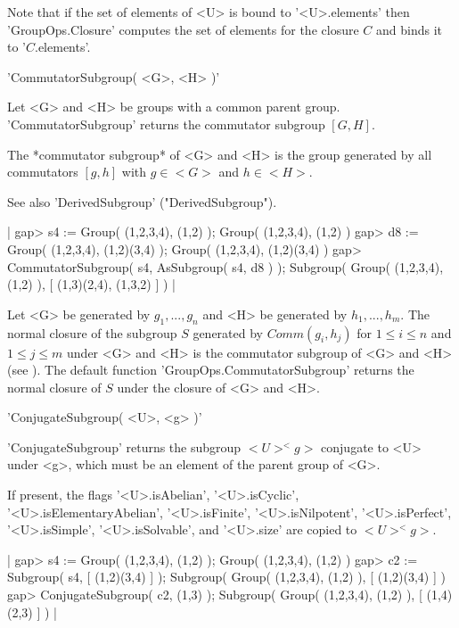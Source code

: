 Note that if the set  of elements of <U> is  bound to '<U>.elements' then
'GroupOps.Closure' computes the set of  elements for the closure $C$  and
binds it to '$C$.elements'.


'CommutatorSubgroup( <G>, <H> )'

Let <G>   and    <H>   be   groups    with   a  common     parent  group.
'CommutatorSubgroup' returns the commutator subgroup $[ G, H ]$.

The *commutator subgroup* of  <G> and <H>  is the group  generated by all
commutators $[ g, h ]$ with $g\in <G>$ and $h\in <H>$.

See also 'DerivedSubgroup' ("DerivedSubgroup").

|    gap> s4 := Group( (1,2,3,4), (1,2) );
    Group( (1,2,3,4), (1,2) )
    gap> d8 := Group( (1,2,3,4), (1,2)(3,4) );
    Group( (1,2,3,4), (1,2)(3,4) )
    gap> CommutatorSubgroup( s4, AsSubgroup( s4, d8 ) );
    Subgroup( Group( (1,2,3,4), (1,2) ), [ (1,3)(2,4), (1,3,2) ] ) |

Let <G> be generated by $g_1,  ..., g_n$ and <H>  be generated  by  $h_1,
..., h_m$.   The normal  closure of the  subgroup $S$ generated by $Comm(
g_i, h_j )$ for $1 \leq i \leq n$ and $1 \leq j \leq m$ under <G> and <H>
is  the commutator  subgroup  of  <G> and  <H>  (see  \cite{Hup67}).  The
default function 'GroupOps.CommutatorSubgroup' returns the normal closure
of $S$ under the closure of <G> and <H>.


'ConjugateSubgroup( <U>, <g> )'

'ConjugateSubgroup' returns the subgroup $<U>^<g>$ conjugate to <U> under
<g>, which must be an element of the parent group of <G>.

If       present,   the      flags      '<U>.isAbelian',  '<U>.isCyclic',
'<U>.isElementaryAbelian',      '<U>.isFinite',        '<U>.isNilpotent',
'<U>.isPerfect',   '<U>.isSimple', '<U>.isSolvable', and   '<U>.size' are
copied to $<U>^<g>$.

|    gap> s4 := Group( (1,2,3,4), (1,2) );
    Group( (1,2,3,4), (1,2) )
    gap> c2 := Subgroup( s4, [ (1,2)(3,4) ] );
    Subgroup( Group( (1,2,3,4), (1,2) ), [ (1,2)(3,4) ] )
    gap> ConjugateSubgroup( c2, (1,3) );
    Subgroup( Group( (1,2,3,4), (1,2) ), [ (1,4)(2,3) ] ) |

